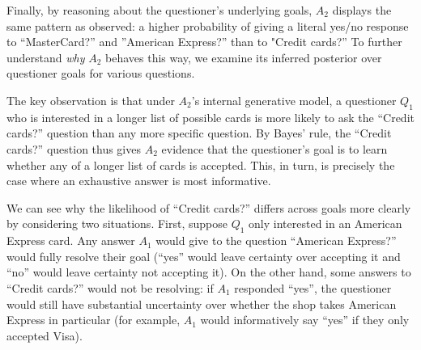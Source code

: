 \documentclass[12pt, floatsintext, jou]{apa6}
\begin{document}
Finally, by reasoning about the questioner's underlying goals, $A_2$ displays the same pattern as  observed: a higher probability of giving a literal yes/no response to ``MasterCard?'' and ''American Express?'' than to "Credit cards?'' To further understand \emph{why} $A_2$ behaves this way, we examine its inferred posterior over questioner goals for various questions. 

The key observation is that under $A_2$'s internal generative model, a questioner $Q_1$ who is interested in a longer list of possible cards is more likely to ask the ``Credit cards?'' question than any more specific question. By Bayes' rule, the ``Credit cards?'' question thus gives $A_2$ evidence that the questioner's goal is to learn whether any of a longer list of cards is accepted. This, in turn, is precisely the case where an exhaustive answer is most informative. 




We can see why the likelihood of ``Credit cards?'' differs across goals more clearly by considering two situations. First, suppose $Q_1$ only interested in an American Express card. Any answer $A_1$ would give to the question ``American Express?'' would fully resolve their goal (``yes'' would leave certainty over accepting it and ``no'' would leave certainty not accepting it). On the other hand, some answers to ``Credit cards?'' would not be resolving: if $A_1$ responded ``yes'', the questioner would still have substantial uncertainty over whether the shop takes American Express in particular (for example, $A_1$ would informatively say ``yes'' if they only accepted Visa). %
\end{document}
